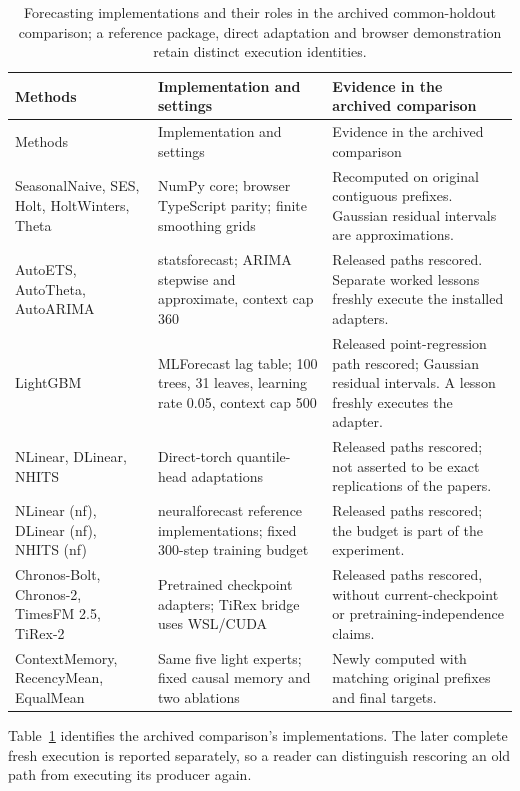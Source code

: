 \documentclass[11pt,a4paper]{article}
\begin{document}
\begin{longtable}{>{\raggedright\arraybackslash}p{}>{\raggedright\arraybackslash}p{}>{\raggedright\arraybackslash}p{}}
\caption{Forecasting implementations and their roles in the archived common-holdout comparison; a reference package, direct adaptation and browser demonstration retain distinct execution identities.}\label{tab:implementation-identities}\\
\toprule Methods & Implementation and settings & Evidence in the archived comparison\\\midrule\endfirsthead
\toprule Methods & Implementation and settings & Evidence in the archived comparison\\\midrule\endhead
SeasonalNaive, SES, Holt, HoltWinters, Theta & NumPy core; browser TypeScript parity; finite smoothing grids & Recomputed on original contiguous prefixes. Gaussian residual intervals are approximations.\\
AutoETS, AutoTheta, AutoARIMA & statsforecast; ARIMA stepwise and approximate, context cap 360 & Released paths rescored. Separate worked lessons freshly execute the installed adapters.\\
LightGBM & MLForecast lag table; 100 trees, 31 leaves, learning rate 0.05, context cap 500 & Released point-regression path rescored; Gaussian residual intervals. A lesson freshly executes the adapter.\\
NLinear, DLinear, NHITS & Direct-torch quantile-head adaptations & Released paths rescored; not asserted to be exact replications of the papers.\\
NLinear (nf), DLinear (nf), NHITS (nf) & neuralforecast reference implementations; fixed 300-step training budget & Released paths rescored; the budget is part of the experiment.\\
Chronos-Bolt, Chronos-2, TimesFM 2.5, TiRex-2 & Pretrained checkpoint adapters; TiRex bridge uses WSL/CUDA & Released paths rescored, without current-checkpoint or pretraining-independence claims.\\
ContextMemory, RecencyMean, EqualMean & Same five light experts; fixed causal memory and two ablations & Newly computed with matching original prefixes and final targets.\\\bottomrule
\end{longtable}

Table~\ref{tab:implementation-identities} identifies the archived comparison's implementations. The later complete fresh execution is reported separately, so a reader can distinguish rescoring an old path from executing its producer again.
\end{document}
